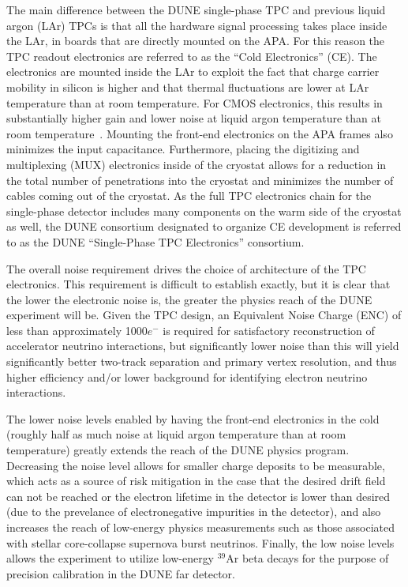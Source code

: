 The main difference between the DUNE single-phase TPC and previous liquid argon (LAr) TPCs is that all the hardware signal processing takes place inside the LAr, in boards that are directly mounted on the APA.  For this reason the TPC readout electronics are referred to as the ``Cold Electronics'' (CE).  The electronics are mounted inside the LAr to exploit the fact that charge carrier mobility in silicon is higher and that thermal fluctuations are lower at LAr temperature than at room temperature.  For CMOS electronics, this results in substantially higher gain and lower noise at liquid argon temperature than at room temperature~\cite{LArCMOS}.  Mounting the front-end electronics on the APA frames also minimizes the input capacitance.  Furthermore, placing the digitizing and multiplexing (MUX) electronics inside of the cryostat allows for a reduction in the total number of penetrations into the cryostat and minimizes the number of cables coming out of the cryostat.  As the full TPC electronics chain for the single-phase detector includes many components on the warm side of the cryostat as well, the DUNE consortium designated to organize CE development is referred to as the DUNE ``Single-Phase TPC Electronics'' consortium.

The overall noise requirement drives the choice of architecture of the TPC electronics. This requirement is difficult to establish exactly, but it is clear that the lower the electronic noise is, the greater the physics reach of the DUNE experiment will be.  Given the TPC design, an Equivalent Noise Charge (ENC) of less than approximately 1000$e^-$ is required for satisfactory reconstruction of accelerator neutrino interactions, but significantly lower noise than this will yield significantly better two-track separation and primary vertex resolution, and thus higher efficiency and/or lower background for identifying electron neutrino interactions.

The lower noise levels enabled by having the front-end electronics in the cold (roughly half as much noise at liquid argon temperature than at room temperature) greatly extends the reach of the DUNE physics program.  Decreasing the noise level allows for smaller charge deposits to be measurable, which acts as a source of risk mitigation in the case that the desired drift field can not be reached or the electron lifetime in the detector is lower than desired (due to the prevelance of electronegative impurities in the detector), and also increases the reach of low-energy physics measurements such as those associated with stellar core-collapse supernova burst neutrinos.  Finally, the low noise levels allows the experiment to utilize low-energy $\mathrm{{}^{39}Ar}$ beta decays for the purpose of precision calibration in the DUNE far detector.

